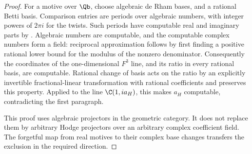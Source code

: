 \begin{proof}
For a motive over $\Qb$, choose algebraic de Rham bases, and a rational Betti basis. Comparison entries are periods over algebraic numbers, with integer powers of $2\pi i$ for the twists. Such periods have computable real and imaginary parts by \cite[Theorem 18, p.~11]{YoshinagaPeriods2008}. Algebraic numbers are computable, and the computable complex numbers form a field: reciprocal approximation follows by first finding a positive rational lower bound for the modulus of the nonzero denominator. Consequently the coordinates of the one-dimensional $F^3$ line, and its ratio in every rational basis, are computable. Rational change of basis acts on the ratio by an explicitly invertible fractional-linear transformation with rational coefficients and preserves this property. Applied to the line $\C(1,ia_H)$, this makes $a_H$ computable, contradicting the first paragraph.

This proof uses algebraic projectors in the geometric category. It does not replace them by arbitrary Hodge projectors over an arbitrary complex coefficient field. The forgetful map from real motives to their complex base changes transfers the exclusion in the required direction.
\end{proof}

